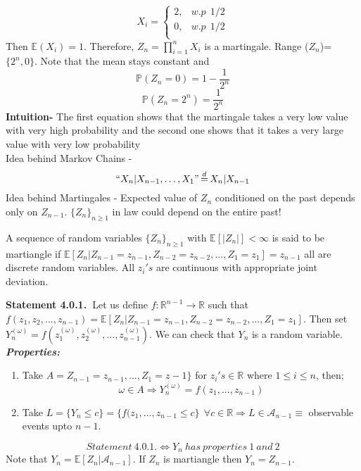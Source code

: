 \documentclass[main]{subfiles}
\begin{document}
\ex
\begin{equation*}
  X_i=
  \begin{cases}
    2 , & w.p ~~ 1/2 \\
    0 , & w.p ~~1/2  \\
  \end{cases}
\end{equation*}
Then $\mathbb{E} (X_i)=1$. Therefore, $Z_n= \prod_{i=1}^n X_i$ is a martingale. Range ($Z_n$)= $\{2^n,0\}$. Note that the mean stays constant and
$$\mathbb{P}(Z_n=0)=1-\frac{1}{2^n}$$
$$\mathbb{P}(Z_n=2^n)=\frac{1}{2^n}$$
\textbf{Intuition-} The first equation shows that the martingale takes a very low value with very high probability and the second one shows that it takes a very large value with very low probability\\
Idea behind Markov Chains -
$$``X_n | X_{n-1}, \ldots, X_1" \,{\buildrel d \over =}\, X_n|X_{n-1}$$
Idea behind Martingales -
Expected value of $Z_n$ conditioned on the past depends only on $Z_{n-1}$. $\{Z_n\}_{n \geq 1}$ in law could depend on the entire past!

\begin{definition}
    A sequence of random variables $\{Z_n\}_{n \geq 1}$ with $\mathbb{E}[|Z_n|] < \infty$ is said to be martiangle if $\mathbb{E}[Z_n | Z_{n-1}=z_{n-1} , Z_{n-2}=z_{n-2}, . . . , Z_1=z_1] = z_{n-1}$ all are discrete random variables. All $z_i's$ are continuous with appropriate joint deviation.
\end{definition}

\textbf{Statement 4.0.1.\ }Let us define $f : \mathbb{R}^{n-1} \rightarrow \mathbb{R}$ such that $f(z_1, z_2,..., z_{n-1}) = \mathbb{E}[Z_n | Z_{n-1}=z_{n-1} , Z_{n-2}=z_{n-2}, . . . , Z_1=z_1]$.
Then set $Y_n^{(\omega)} = f(z_1^{(\omega)}, z_2^{(\omega)},..., z_{n-1}^{(\omega)})$. We can check that $Y_n$ is a random variable.\\

\emph{\textbf{Properties:}}
\begin{enumerate}
    \item 
    Take $A = Z_{n-1}=z_{n-1},..., Z_1=z-1\}$ for $z_i's \in \mathbb{R}$ where $1 \leq i \leq n$, then;
    \[\omega \in A \Rightarrow Y_n^{(\omega)} = f(z_1,..., z_{n-1})\]
    \item
    Take $L = \{Y_n \leq c\} = \{f(z_1,..., z_{n-1} \leq c\} \ \  \forall c \in \mathbb{R} \Rightarrow L \in \mathcal{A}_{n-1} \equiv$ observable events upto $n-1$.
\end{enumerate}
\[{Statement \  4.0.1.} \iff Y_n \ has \ properties \ 1 \ and \  2\]
Note that $Y_n = \mathbb{E}[Z_n | \mathcal{A}_{n-1}]$. If $Z_n$ is martiangle then $Y_n = Z_{n-1}$.\\
\end{document}
